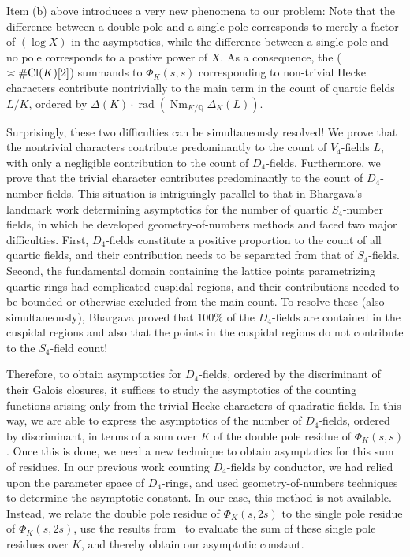 \documentclass[10pt]{article}
\theoremstyle{plain}
\theoremstyle{definition}
\theoremstyle{remark}
\DeclareMathOperator{\Cl}{Cl}
\DeclareMathOperator{\rad}{rad}
\def\Cl{{\rm Cl}}
\def\Q{{\mathbb Q}}
\def\Q{{\mathbb Q}}
\DeclareMathOperator{\Nm}{Nm}
\begin{document}
Item (b) above introduces a very new phenomena to our problem: Note that
the difference between a double pole and a single pole corresponds to merely a
factor of $(\log X)$ in the asymptotics, while the difference between
a single pole and no pole corresponds to a postive power of $X$. As a consequence,
the ($\asymp\#\Cl(K)[2]$) summands to $\Phi_K(s,s)$ corresponding to
non-trivial Hecke characters contribute nontrivially to the main term
in the count of quartic fields $L/K$, ordered by $\Delta(K)\cdot
\rad(\Nm_{K/\Q}\Delta_K(L))$.

Surprisingly, these two difficulties can be simultaneously
resolved! We prove that the nontrivial characters contribute
predominantly to the count of $V_4$-fields $L$, with only a negligible
contribution to the count of $D_4$-fields. Furthermore, we prove that
the trivial character contributes predominantly to the count of
$D_4$-number fields. This situation is intriguingly parallel to that in Bhargava's landmark work \cite{MR2183288} determining asymptotics for the number of quartic $S_4$-number fields, in which he developed geometry-of-numbers methods and faced two major difficulties. First, $D_4$-fields constitute a positive proportion to the count of all quartic fields, and their contribution needs to be separated from that of $S_4$-fields. Second, the fundamental domain containing the lattice points parametrizing quartic rings had complicated cuspidal regions, and their contributions needed to be bounded or otherwise excluded from the main count. To resolve these (also simultaneously), Bhargava proved that $100\%$ of the $D_4$-fields are contained in the cuspidal regions and also that the points in the cuspidal regions do not contribute to the $S_4$-field count!



Therefore, to obtain asymptotics for
 $D_4$-fields, ordered by the discriminant of their Galois
closures, it suffices to study the asymptotics of the counting
functions arising only from the trivial Hecke characters of quadratic
fields. In this way, we are able to express the asymptotics of the
number of $D_4$-fields, ordered by discriminant, in terms of a sum
over $K$ of the double pole residue of $\Phi_K(s,s)$. Once this is done, we need a new technique to obtain asymptotics for this sum of residues. In our previous work counting $D_4$-fields by conductor, we had relied upon the parameter space of $D_4$-rings, and used geometry-of-numbers techniques to determine the asymptotic constant. In our case, this method is not available. Instead, we
relate the double pole residue of $\Phi_K(s,2s)$ to the single pole residue of
$\Phi_K(s,2s)$, use the results from~\cite{D4preprint} to evaluate the sum of these single pole residues over $K$, and thereby obtain our asymptotic constant.
\end{document}
